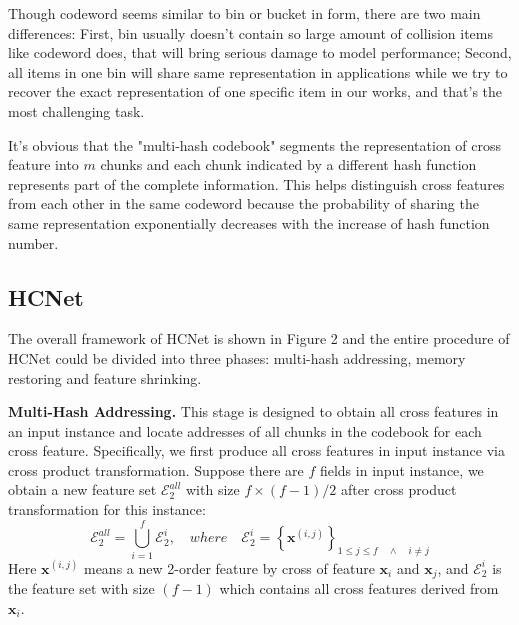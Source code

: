 \documentclass[sigconf,authorversion]{acmart}
\begin{document}
Though codeword seems similar to bin or bucket\cite{bins} in form, there are two main differences: First, bin usually doesn't  contain  so large amount of collision items like codeword does, that will bring serious damage to model performance; Second, all items in one bin will share same representation in applications while we try to recover the exact representation of one specific item in our works, and that's the most challenging task.

It's obvious that the "multi-hash codebook" segments the representation of cross feature into  $m$ chunks and each chunk indicated by a different hash function represents part of the complete information. This helps distinguish cross features from each other in the same codeword because the probability of sharing the same representation exponentially decreases with the increase of hash function number.
\subsection{HCNet}
The overall framework of HCNet is shown in Figure 2 and the entire procedure of HCNet could be divided into three phases: multi-hash addressing, memory restoring and feature shrinking.  

\textbf{Multi-Hash Addressing.}
This stage is designed to obtain all cross features in an input instance and locate addresses of all chunks in the codebook for each cross feature. Specifically, we first produce all cross features in input instance via cross product transformation. Suppose there are $f$ fields in input instance, we obtain a new feature set $\mathcal{E}_2^{all}$ with size $f\times (f-1)/2$  after cross product transformation for this instance:
 \begin{equation}
  \mathcal{E}_2^{all} = \bigcup_{i=1}^{f}\mathcal{E}_2^{i}  , \quad where \quad \mathcal{E}_2^{i} = \left\{  \mathbf{x}^{(i,j)} \right\}_{1 \leqslant j \leqslant f \quad \wedge \quad i\neq j}
\end{equation}
Here $\mathbf{x}^{(i,j)}$ means a new 2-order feature by cross of feature $\mathbf{x}_i$ and $\mathbf{x}_j$, and $\mathcal{E}_2^{i}$ is the feature set with size $(f-1)$ which contains all cross features  derived from  $\mathbf{x}_i$.
\end{document}
